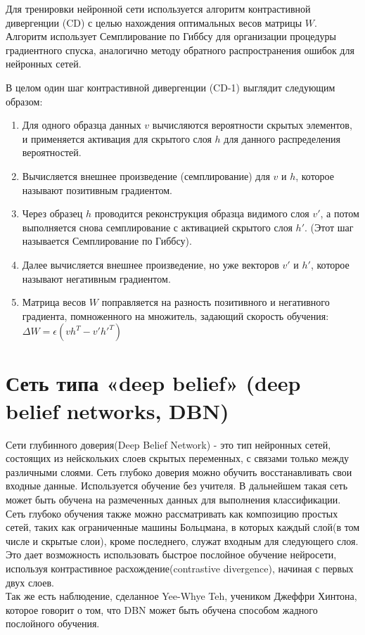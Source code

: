 \documentclass[paper=a4, fontsize=11pt]{scrartcl} %
\numberwithin{equation}{section} %
\numberwithin{figure}{section} %
\numberwithin{table}{section} %
\begin{document}
	Для тренировки нейронной сети используется алгоритм контрастивной дивергенции (CD) с целью нахождения оптимальных весов матрицы $W$. Алгоритм использует Семплирование по Гиббсу для организации процедуры градиентного спуска, аналогично методу обратного распространения ошибок для нейронных сетей.
	
	В целом один шаг контрастивной дивергенции (CD-1) выглядит следующим образом:
	\begin{enumerate}
		\item Для одного образца данных $v$ вычисляются вероятности скрытых элементов, и применяется активация для скрытого слоя $h$ для данного распределения вероятностей.
		\item Вычисляется внешнее произведение (семплирование) для $v$ и $h$, которое называют позитивным градиентом.
		\item Через образец $h$ проводится реконструкция образца видимого слоя $v'$, а потом выполняется снова семплирование с активацией скрытого слоя $h'$. (Этот шаг называется Семплирование по Гиббсу).
		\item Далее вычисляется внешнее произведение, но уже векторов $v'$ и $h'$, которое называют негативным градиентом.
		\item Матрица весов $W$ поправляется на разность позитивного и негативного градиента, помноженного на множитель, задающий скорость обучения: $\Delta W = \epsilon(vh^T - v'h'^T)$
	\end{enumerate}
	
	\section{Сеть типа «deep belief» (deep belief networks, DBN)}
	
	Сети глубинного доверия(Deep Belief Network) - это тип нейронных сетей, состоящих из нейскольких слоев скрытых переменных, с связами только между различными слоями. Сеть глубоко доверия можно обучить восстанавливать свои входные данные. Используется обучение без учителя. В дальнейшем такая сеть может быть обучена на размеченных данных для выполнения классификации.\\
	Сеть глубоко обучения также можно рассматривать как композицию простых сетей, таких как ограниченные машины Больцмана, в которых каждый слой(в том числе и скрытые слои), кроме последнего, служат входным для следующего
	слоя. Это дает возможность использовать быстрое послойное обучение нейросети, используя контрастивное расхождение(contrastive divergence), начиная с первых двух слоев.\\
	Так же есть наблюдение, сделанное Yee-Whye Teh, учеником Джеффри Хинтона, которое говорит о том, что DBN может быть обучена способом жадного послойного обучения.
	
\end{document}
